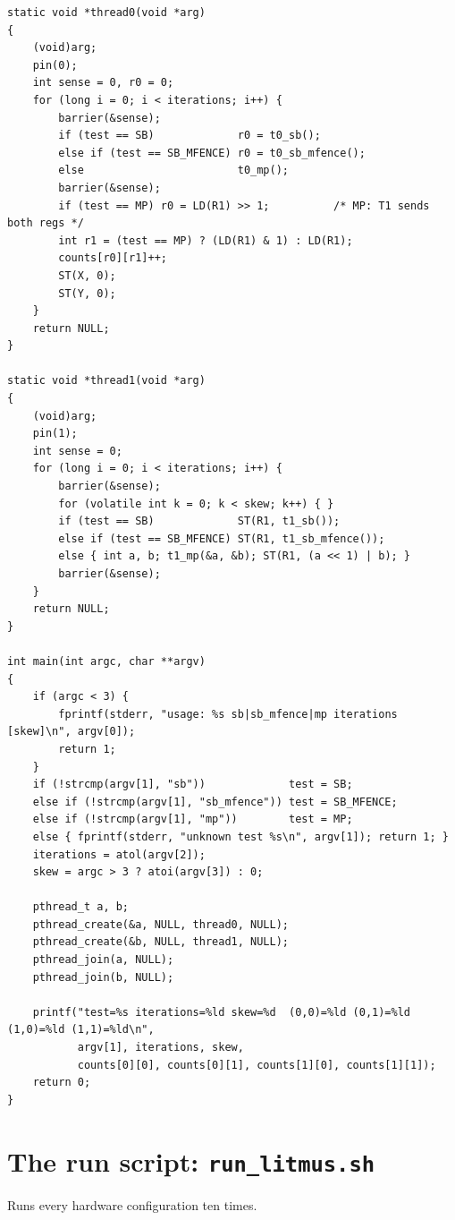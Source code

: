 \begin{lstlisting}[style=vsc]
static void *thread0(void *arg)
{
    (void)arg;
    pin(0);
    int sense = 0, r0 = 0;
    for (long i = 0; i < iterations; i++) {
        barrier(&sense);
        if (test == SB)             r0 = t0_sb();
        else if (test == SB_MFENCE) r0 = t0_sb_mfence();
        else                        t0_mp();
        barrier(&sense);
        if (test == MP) r0 = LD(R1) >> 1;          /* MP: T1 sends both regs */
        int r1 = (test == MP) ? (LD(R1) & 1) : LD(R1);
        counts[r0][r1]++;
        ST(X, 0);
        ST(Y, 0);
    }
    return NULL;
}

static void *thread1(void *arg)
{
    (void)arg;
    pin(1);
    int sense = 0;
    for (long i = 0; i < iterations; i++) {
        barrier(&sense);
        for (volatile int k = 0; k < skew; k++) { }
        if (test == SB)             ST(R1, t1_sb());
        else if (test == SB_MFENCE) ST(R1, t1_sb_mfence());
        else { int a, b; t1_mp(&a, &b); ST(R1, (a << 1) | b); }
        barrier(&sense);
    }
    return NULL;
}

int main(int argc, char **argv)
{
    if (argc < 3) {
        fprintf(stderr, "usage: %s sb|sb_mfence|mp iterations [skew]\n", argv[0]);
        return 1;
    }
    if (!strcmp(argv[1], "sb"))             test = SB;
    else if (!strcmp(argv[1], "sb_mfence")) test = SB_MFENCE;
    else if (!strcmp(argv[1], "mp"))        test = MP;
    else { fprintf(stderr, "unknown test %s\n", argv[1]); return 1; }
    iterations = atol(argv[2]);
    skew = argc > 3 ? atoi(argv[3]) : 0;

    pthread_t a, b;
    pthread_create(&a, NULL, thread0, NULL);
    pthread_create(&b, NULL, thread1, NULL);
    pthread_join(a, NULL);
    pthread_join(b, NULL);

    printf("test=%s iterations=%ld skew=%d  (0,0)=%ld (0,1)=%ld (1,0)=%ld (1,1)=%ld\n",
           argv[1], iterations, skew,
           counts[0][0], counts[0][1], counts[1][0], counts[1][1]);
    return 0;
}
\end{lstlisting}

\section{The run script: \texttt{run\_litmus.sh}}
Runs every hardware configuration ten times.

